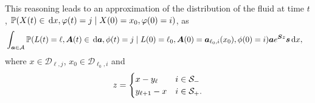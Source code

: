 This reasoning leads to an approximation of the distribution of the fluid at time \(t\), \(\mathbb P(X(t)\in \, \mathrm{d} x , \varphi(t) = j\mid X(0)=x_0, \varphi(0) = i) \), as
\begin{align}
		&\int_{\boldsymbol a \in\mathcal A}\mathbb P(L(t) = \ell, \boldsymbol A(t)\in\, \mathrm{d} \boldsymbol a,\phi(t) = j\mid L(0)=\ell_0, \boldsymbol A(0) = \boldsymbol a_{\ell_0,i}(x_0), \phi(0) = i)  
		\boldsymbol a e^{\boldsymbol{S}z} \boldsymbol s \, \mathrm{d} x,\label{eqn: density approx aug}
\end{align}
where \(x\in\mathcal D_{\ell,j}\), \(x_0\in\mathcal D_{\ell_0,i}\) and 
\[
	z = \begin{cases} 
		x - y_\ell & i\in\mathcal{S}_- \\
		y_{\ell+1} - x & i\in\mathcal{S}_+.
	\end{cases}
\]

